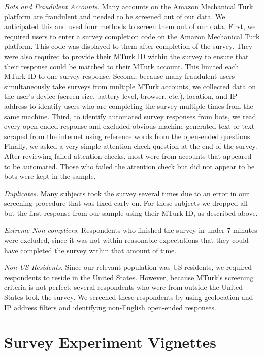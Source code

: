 \documentclass[]{article}
\begin{document}
\textit{Bots and Fraudulent Accounts.} Many accounts on the Amazon Mechanical Turk platform are fraudulent and needed to be screened out of our data. We anticipated this and used four methods to screen them out of our data. First, we required users to enter a survey completion code on the Amazon Mechanical Turk platform. This code was displayed to them after completion of the survey. They were also required to provide their MTurk ID within the survey to ensure that their response could be matched to their MTurk account. This limited each MTurk ID to one survey response. Second, because many fraudulent users simultaneously take surveys from multiple MTurk accounts, we collected data on the user's device (screen size, battery level, browser, etc.), location, and IP address to identify users who are completing the survey multiple times from the same machine. Third, to identify automated survey responses from bots, we read every open-ended response and excluded obvious machine-generated text or text scraped from the internet using reference words from the open-ended questions. Finally, we asked a very simple attention check question at the end of the survey. After reviewing failed attention checks, most were from accounts that appeared to be automated. Those who failed the attention check but did not appear to be bots were kept in the sample.

\textit{Duplicates.} Many subjects took the survey several times due to an error in our screening procedure that was fixed early on. For these subjects we dropped all but the first response from our sample using their MTurk ID, as described above.

\textit{Extreme Non-compliers.} Respondents who finished the survey in under 7 minutes were excluded, since it was not within reasonable expectations that they could have completed the survey within that amount of time.

\textit{Non-US Residents.} Since our relevant population was US residents, we required respondents to reside in the United States. However, because MTurk's screening criteria is not perfect, several respondents who were from outside the United States took the survey. We screened these respondents by using geolocation and IP address filters and identifying non-English open-ended responses.

\section{Survey Experiment Vignettes}
\end{document}
